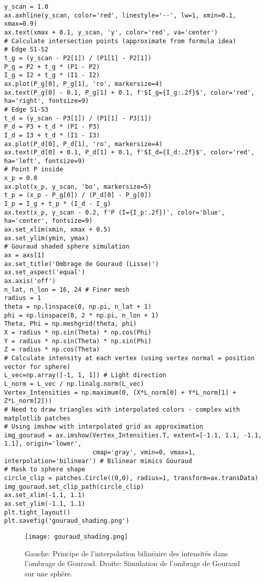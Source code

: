 \begin{verbatim}
y_scan = 1.0
ax.axhline(y_scan, color='red', linestyle='--', lw=1, xmin=0.1, xmax=0.9)
ax.text(xmax + 0.1, y_scan, 'y', color='red', va='center')
# Calculate intersection points (approximate from formula idea)
# Edge S1-S2
t_g = (y_scan - P2[1]) / (P1[1] - P2[1])
P_g = P2 + t_g * (P1 - P2)
I_g = I2 + t_g * (I1 - I2)
ax.plot(P_g[0], P_g[1], 'ro', markersize=4)
ax.text(P_g[0] - 0.1, P_g[1] + 0.1, f'$I_g={I_g:.2f}$', color='red', ha='right', fontsize=9)
# Edge S1-S3
t_d = (y_scan - P3[1]) / (P1[1] - P3[1])
P_d = P3 + t_d * (P1 - P3)
I_d = I3 + t_d * (I1 - I3)
ax.plot(P_d[0], P_d[1], 'ro', markersize=4)
ax.text(P_d[0] + 0.1, P_d[1] + 0.1, f'$I_d={I_d:.2f}$', color='red', ha='left', fontsize=9)
# Point P inside
x_p = 0.0
ax.plot(x_p, y_scan, 'bo', markersize=5)
t_p = (x_p - P_g[0]) / (P_d[0] - P_g[0])
I_p = I_g + t_p * (I_d - I_g)
ax.text(x_p, y_scan - 0.2, f'P (I={I_p:.2f})', color='blue', ha='center', fontsize=9)
ax.set_xlim(xmin, xmax + 0.5)
ax.set_ylim(ymin, ymax)
# Gouraud shaded sphere simulation
ax = axs[1]
ax.set_title('Ombrage de Gouraud (Lisse)')
ax.set_aspect('equal')
ax.axis('off')
n_lat, n_lon = 16, 24 # Finer mesh
radius = 1
theta = np.linspace(0, np.pi, n_lat + 1)
phi = np.linspace(0, 2 * np.pi, n_lon + 1)
Theta, Phi = np.meshgrid(theta, phi)
X = radius * np.sin(Theta) * np.cos(Phi)
Y = radius * np.sin(Theta) * np.sin(Phi)
Z = radius * np.cos(Theta)
# Calculate intensity at each vertex (using vertex normal = position vector for sphere)
L_vec=np.array([-1, 1, 1]) # Light direction
L_norm = L_vec / np.linalg.norm(L_vec)
Vertex_Intensities = np.maximum(0, (X*L_norm[0] + Y*L_norm[1] + Z*L_norm[2]))
# Need to draw triangles with interpolated colors - complex with matplotlib patches
# Using imshow with interpolated grid as approximation
img_gouraud = ax.imshow(Vertex_Intensities.T, extent=[-1.1, 1.1, -1.1, 1.1], origin='lower',
                        cmap='gray', vmin=0, vmax=1, interpolation='bilinear') # Bilinear mimics Gouraud
# Mask to sphere shape
circle_clip = patches.Circle((0,0), radius=1, transform=ax.transData)
img_gouraud.set_clip_path(circle_clip)
ax.set_xlim(-1.1, 1.1)
ax.set_ylim(-1.1, 1.1)
plt.tight_layout()
plt.savefig('gouraud_shading.png')
\end{verbatim}
\begin{figure}[H]
\centering
\texttt{[image: gouraud\_shading.png]}
\caption{Gauche: Principe de l'interpolation bilinéaire des intensités dans l'ombrage de Gouraud. Droite: Simulation de l'ombrage de Gouraud sur une sphère.}
\label{fig:gouraud_shading}
\end{figure}
